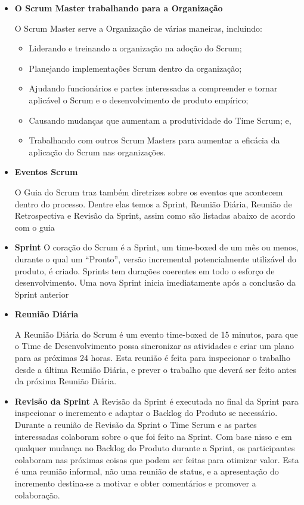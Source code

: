 \begin{itemize}
\item \textbf{O Scrum Master trabalhando para a Organização}
\label{subs:O Scrum Master trabalhando para a Organização}

O Scrum Master serve a Organização de várias maneiras, incluindo:
\begin{itemize}
\item  Liderando e treinando a organização na adoção do Scrum;
\item  Planejando implementações Scrum dentro da organização;
\item  Ajudando funcionários e partes interessadas a compreender e tornar aplicável o Scrum e o
desenvolvimento de produto empírico;
\item  Causando mudanças que aumentam a produtividade do Time Scrum; e,
\item  Trabalhando com outros Scrum Masters para aumentar a eficácia da aplicação do Scrum
nas organizações.
\end{itemize}

\item \textbf{Eventos Scrum}
\label{sub:Eventos Scrum}

O Guia do Scrum \cite{guiaScrum} traz também diretrizes sobre os eventos que acontecem dentro
do processo. Dentre elas temos a Sprint, Reunião Diária, Reunião de Retrospectiva e Revisão da Sprint,
assim como são listadas abaixo de acordo com o guia \cite{guiaScrum}

\item \textbf{Sprint}
\label{subs:Sprint}
O coração do Scrum é a Sprint, um time-boxed de um mês ou menos, durante o qual um
“Pronto”, versão incremental potencialmente utilizável do produto, é criado. Sprints tem
durações coerentes em todo o esforço de desenvolvimento. Uma nova Sprint inicia
imediatamente após a conclusão da Sprint anterior

\item \textbf{Reunião Diária}
\label{subs:Reunião Diária}

A Reunião Diária do Scrum é um evento time-boxed de 15 minutos, para que o Time de
Desenvolvimento possa sincronizar as atividades e criar um plano para as próximas 24 horas.
Esta reunião é feita para inspecionar o trabalho desde a última Reunião Diária, e prever o
trabalho que deverá ser feito antes da próxima Reunião Diária.

\item \textbf{Revisão da Sprint}
\label{subs:Revisão da Sprint}
A Revisão da Sprint é executada no final da Sprint para inspecionar o incremento e adaptar o
Backlog do Produto se necessário. Durante a reunião de Revisão da Sprint o Time Scrum e as
partes interessadas colaboram sobre o que foi feito na Sprint. Com base nisso e em qualquer
mudança no Backlog do Produto durante a Sprint, os participantes colaboram nas próximas
coisas que podem ser feitas para otimizar valor. Esta é uma reunião informal, não uma reunião
de status, e a apresentação do incremento destina-se a motivar e obter comentários e
promover a colaboração.


\end{itemize}
